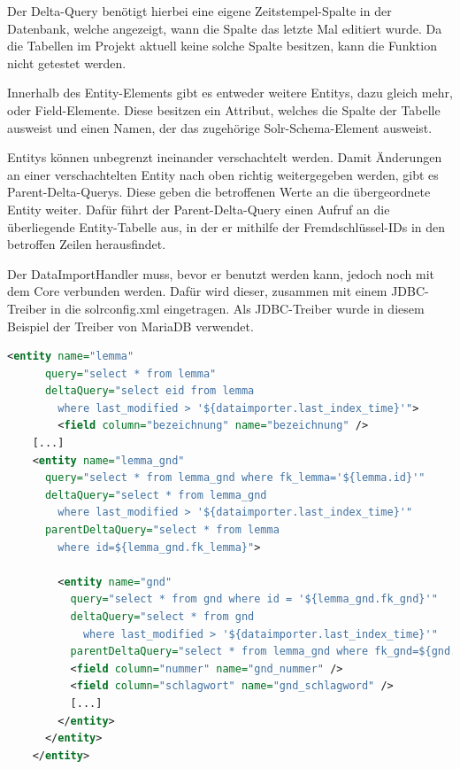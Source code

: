 Der Delta-Query benötigt hierbei eine eigene Zeitstempel-Spalte in der Datenbank, welche angezeigt, wann die Spalte das letzte Mal editiert wurde. Da die Tabellen im Projekt aktuell keine solche Spalte besitzen, kann die Funktion nicht getestet werden.

Innerhalb des Entity-Elements gibt es entweder weitere Entitys, dazu gleich mehr, oder Field-Elemente. Diese besitzen ein Attribut, welches die Spalte der Tabelle ausweist und einen Namen, der das zugehörige Solr-Schema-Element ausweist. 

Entitys können unbegrenzt ineinander verschachtelt werden. Damit Änderungen an einer verschachtelten Entity nach oben richtig weitergegeben werden, gibt es Parent-Delta-Querys. Diese geben die betroffenen Werte an die übergeordnete Entity weiter. Dafür führt der Parent-Delta-Query einen Aufruf an die überliegende Entity-Tabelle aus, in der er mithilfe der Fremdschlüssel-IDs in den betroffen Zeilen herausfindet.

Der DataImportHandler muss, bevor er benutzt werden kann, jedoch noch mit dem Core verbunden werden. Dafür wird dieser, zusammen mit einem JDBC-Treiber in die solrconfig.xml eingetragen. Als JDBC-Treiber wurde in diesem Beispiel der Treiber von MariaDB verwendet.

\begin{lstlisting}[language=xml, frame=single, label={lst:dih}, 
    morekeywords={entity,query,deltaQuery,parentDeltaQuery,field,column, name}] 
    <entity name="lemma" 
      query="select * from lemma" 
      deltaQuery="select eid from lemma 
        where last_modified > '${dataimporter.last_index_time}'"> 
		<field column="bezeichnung" name="bezeichnung" />
    [...]
    <entity name="lemma_gnd" 
      query="select * from lemma_gnd where fk_lemma='${lemma.id}'"
      deltaQuery="select * from lemma_gnd 
        where last_modified > '${dataimporter.last_index_time}'"
      parentDeltaQuery="select * from lemma 
        where id=${lemma_gnd.fk_lemma}">
			
        <entity name="gnd" 
          query="select * from gnd where id = '${lemma_gnd.fk_gnd}'"
          deltaQuery="select * from gnd 
            where last_modified > '${dataimporter.last_index_time}'"
          parentDeltaQuery="select * from lemma_gnd where fk_gnd=${gnd.id}">
          <field column="nummer" name="gnd_nummer" />
          <field column="schlagwort" name="gnd_schlagword" />
          [...]
        </entity>
      </entity>  
    </entity>
\end{lstlisting}

